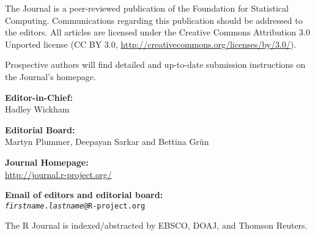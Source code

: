 \documentclass[a4paper]{report}
\begin{document}
\sectionhead{}

\titlepage

\vspace*{1in}
\begin{center}
\begin{minipage}{0.65\textwidth}
    \begin{center}
    The \R{} Journal is a peer-reviewed publication of
    the \R{} Foundation for Statistical Computing. Communications
    regarding this publication should be addressed to the editors. All
    articles are licensed under the Creative Commons Attribution 3.0 Unported
    license (CC BY 3.0, \url{http://creativecommons.org/licenses/by/3.0/}).
    \bigskip

    Prospective authors will find detailed and up-to-date submission
    instructions on the Journal's homepage.

    \bigskip
      \textbf{Editor-in-Chief:}\\
      Hadley Wickham

    \bigskip
      \textbf{Editorial Board:}\\
      Martyn Plummer, Deepayan Sarkar and Bettina Gr\"un

    \bigskip
    \textbf{\R{} Journal Homepage:}\\
    \url{http://journal.r-project.org/}
    
    \bigskip
    \textbf{Email of editors and editorial board:}\\
    \texttt{\textit{firstname}.\textit{lastname}@R-project.org}

    \bigskip The R Journal is indexed/abstracted by EBSCO, DOAJ, and Thomson Reuters.  
      
  \end{center}
    
  \end{minipage}
\end{center}

\newpage

\begin{article}
  
\end{article}
\cleardoublepage



\end{document}
